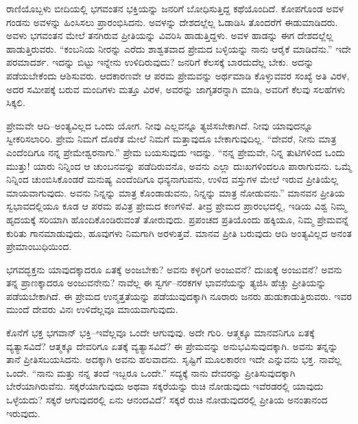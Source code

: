 ರಾಣಿಯೊಬ್ಬಳು ಬೀದಿಯಲ್ಲಿ ಭಗವಂತನ ಭಕ್ತಿಯನ್ನು ಜನರಿಗೆ ಬೋಧಿಸುತ್ತಿದ್ದ ಕಥೆಯೊಂದಿದೆ. ಕೋಪಗೊಂಡ ಅವಳ ಗಂಡನು ಅವಳನ್ನು ಹಿಂಸಿಸಲು ಪ್ರಾರಂಭಿಸಿದನು. ಅವಳನ್ನು ದೇಶದಲ್ಲೆಲ್ಲ ಓಡಾಡಿಸಿ ತೊಂದರೆಗೆ ಈಡುಮಾಡಿದರು. ಅವಳು ಭಗವಂತನ ಮೇಲೆ ತನಗಿರುವ ಪ್ರೀತಿಯನ್ನು ವಿವರಿಸಿ ಹಾಡುತ್ತಿದ್ದಳು. ಅವಳ ಹಾಡನ್ನು ಈಗ ದೇಶದಲ್ಲೆಲ್ಲ ಹಾಡುತ್ತಿರುವರು. “ಕಂಬನಿಯ ನೀರನ್ನು ಎರೆದು ಶಾಶ್ವತವಾದ ಪ್ರೇಮದ ಬಳ್ಳಿಯನ್ನು ನಾನು ಆರೈಕೆ ಮಾಡಿದೆನು.” ಇದೇ ಪರಮಾದರ್ಶ. ಇದನ್ನು ಬಿಟ್ಟು ಇನ್ನೇನು ಉಳಿದಿರುವುದು? ಜನರಿಗೆ ಕೆಲಸಕ್ಕೆ ಬಾರದುದೆಲ್ಲ ಬೇಕು. ಅದನ್ನು ಪಡೆಯಬೇಕೆಂದು ಆಶಿಸುವರು. ಆದಕಾರಣವೇ ಆ ಪರಮ ಪ್ರೇಮವನ್ನು ಅರ್ಥಮಾಡಿ ಕೊಳ್ಳುವವರ ಸಂಖ್ಯೆ ಅತಿ ವಿರಳ, ಅದರ ಸಮೀಪಕ್ಕೆ ಬರುವ ಮಂದಿಗಳು ಮತ್ತೂ ವಿರಳ, ಅವರನ್ನು ಜಾಗೃತರನ್ನಾಗಿ ಮಾಡಿ, ಅವರಿಗೆ ಕೆಲವು ಸಲಹೆಗಳು ಸಿಕ್ಕಲಿ.

ಪ್ರೇಮವೇ ಆದಿ–ಅಂತ್ಯವಿಲ್ಲದ ಒಂದು ಯೋಗ. ನೀವು ಎಲ್ಲವನ್ನೂ ತ್ಯಜಿಸಬೇಕಾಗಿದೆ. ನೀವು ಯಾವುದನ್ನೂ ಸ್ವೀಕರಿಸಲಾರಿರಿ. ಪ್ರೇಮ ನಿಮಗೆ ದೊರೆತ ಮೇಲೆ ನಿಮಗೆ ಮತ್ತಾವುದೂ ಬೇಕಾಗುವುದಿಲ್ಲ. “ದೇವರೆ, ನೀನು ಮಾತ್ರ ಎಂದೆಂದಿಗೂ ನನ್ನ ಪ್ರೇಮೇಶ್ವರನಾಗು.” ಪ್ರೇಮ ಬಯಸುವುದು ಇದನ್ನು. “ನನ್ನ ಪ್ರೇಮವೇ, ನಿನ್ನ ತುಟಿಗಳಿಂದ ಒಂದು ಮುತ್ತು! ಯಾರು ನಿನ್ನಿಂದ ಆ ಚುಂಬನವನ್ನು ಪಡೆದಿರುವನೊ, ಅವನು ಎಲ್ಲಾ ದುಃಖಗಳಿಂದಲೂ ಪಾರಾಗುವನು. ಒಮ್ಮೆ ನಿನ್ನಿಂದ ಚುಂಬಿಸಿಕೊಂಡರೆ ಮನುಷ್ಯ ಎಂದೆಂದಿಗೂ ಧನ್ಯನಾಗುವನು, ಉಳಿದ ವಸ್ತುಗಳ ಮೇಲೆ ಇರುವ ಪ್ರೀತಿಯೆಲ್ಲ ಮಾಯವಾಗುವುದು. ಅವನು ನಿನ್ನನ್ನು ಮಾತ್ರ ಕೊಂಡಾಡುವನು, ನಿನ್ನನ್ನು ಮಾತ್ರ ನೋಡುವನು.” ಮಾನವನ ಪ್ರೀತಿಯ ಸ್ವಭಾವದಲ್ಲಿಯೂ ಕೂಡ ಆ ಪರಮ ಪವಿತ್ರ ಪ್ರೇಮದ ಕಣಗಳಿವೆ. ತೀವ್ರ ಪ್ರೇಮದ ಪ್ರಾರಂಭದಲ್ಲಿ, ಇಡಿಯ ವಿಶ್ವ ನಿಮ್ಮ ಹೃದಯಕ್ಕೆ ಸರಿಯಾಗಿ ಹೊಂದಿಕೊಂಡಿರುವಂತೆ ತೋರುವುದು. ಪ್ರಪಂಚದ ಪ್ರತಿಯೊಂದು ಹಕ್ಕಿಯೂ, ನಿಮ್ಮ ಪ್ರೇಮವನ್ನೆ ಕುರಿತು ಗಾನಮಾಡುವುದು, ಹೂವುಗಳು ನಿಮಗಾಗಿ ಅರಳುತ್ತವೆ. ಮಾನವ ಪ್ರೀತಿ ಬರುವುದು ಆದಿ ಅಂತ್ಯವಿಲ್ಲದ ಅನಂತ ಪ್ರೇಮಾಂಬುಧಿಯಿಂದ.

ಭಗವದ್ಭಕ್ತನು ಯಾವುದಕ್ಕಾದರೂ ಏತಕ್ಕೆ ಅಂಜಬೇಕು? ಅವನು ಕಳ್ಳರಿಗೆ ಅಂಜುವನೆ? ದುಃಖಕ್ಕೆ ಅಂಜುವನೆ? ಅವನು ತನ್ನ ಪ್ರಾಣಕ್ಕಾದರೂ ಅಂಜುವನೇನು? ನಾವೆಲ್ಲ ಈ ಸ್ವರ್ಗ–ನರಕಗಳ ಭಾವನೆಯನ್ನು ತ್ಯಜಿಸಿ ಹೆಚ್ಚು ಪ್ರೀತಿಯನ್ನು ಪಡೆಯಬೇಕಾಗಿದೆ. ಈ ಪ್ರೇಮದ ಉನ್ಮತ್ತತೆಯನ್ನು ಪಡೆಯುವುದಕ್ಕಾಗಿ ನೂರಾರು ಜನರು ಹುಡುಕಾಡುತ್ತಿರುವರು. ಇವರ ಮುಂದೆ ದೇವರು ವಿನಃ ಉಳಿದೆಲ್ಲವೂ ಮಾಯವಾಗುವುದು.

\vskip 2pt

ಕೊನೆಗೆ ಭಕ್ತ ಭಗವಾನ್ ಭಕ್ತಿ–ಇವೆಲ್ಲವೂ ಒಂದೇ ಆಗುವುವು. ಅದೇ ಗುರಿ. ಆತ್ಮಕ್ಕೂ ಮಾನವನಿಗೂ ಏತಕ್ಕೆ ವ್ಯತ್ಯಾಸವಿದೆ? ಆತ್ಮಕ್ಕೂ ದೇವರಿಗೂ ಏತಕ್ಕೆ ವ್ಯತ್ಯಾಸವಿದೆ? ಈ ಪ್ರೇಮವನ್ನು ಅನುಭವಿಸುವುದಕ್ಕಾಗಿ. ಅವನು ತನ್ನನ್ನು ತಾನೆ ಪ್ರೀತಿಸಬಯಸಿದನು. ಅದಕ್ಕಾಗಿ ಅವನು ಹಲವಾದನು. ಸೃಷ್ಟಿಗೆ ಮೂಲಕಾರಣ ಇದೇ ಎನ್ನುವನು ಭಕ್ತ. ನಾವೆಲ್ಲ ಒಂದೇ. “ನಾನು ಮತ್ತು ನನ್ನ ತಂದೆ ಇಬ್ಬರೂ ಒಂದೇ.” ಸದ್ಯಕ್ಕೆ ನಾನು ದೇವರನ್ನು ಪ್ರೀತಿಸುವುದಕ್ಕಾಗಿ ಬೇರೆಯಾಗಿರುವೆನು. ಸಕ್ಕರೆಯಾಗುವುದು ಅಥವಾ ಸಕ್ಕರೆಯನ್ನು ರುಚಿ ನೋಡುವುದು ಇವೆರಡರಲ್ಲಿ ಯಾವುದು ಒಳ್ಳೆಯದು? ಸಕ್ಕರೆ ಆಗುವುದರಲ್ಲಿ ಏನು ಆನಂದವಿದೆ? ಸಕ್ಕರೆ ರುಚಿ ನೋಡುವುದರಲ್ಲಿ ಪ್ರೀತಿಯ ಅನಂತಾನಂದ ಇರುವುದು.

\vskip 2pt


